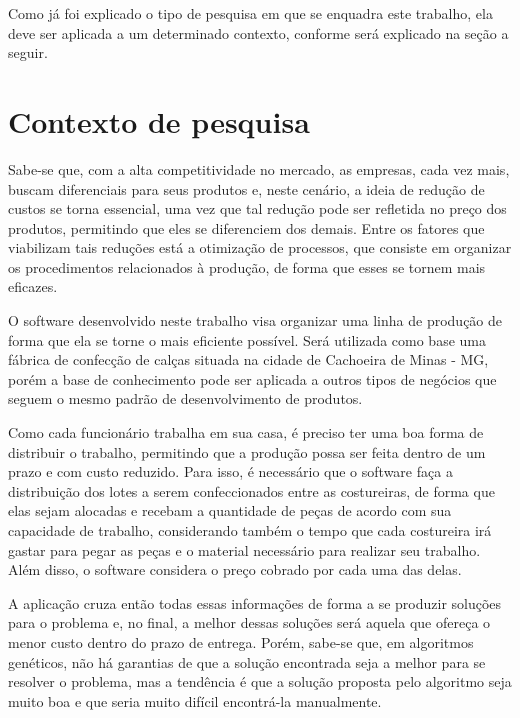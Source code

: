 \par Como já foi explicado o tipo de pesquisa em que se enquadra este trabalho,
ela deve ser aplicada a um determinado contexto, conforme será explicado na
seção a seguir.

\section{Contexto de pesquisa}

\par Sabe-se que, com a alta competitividade no mercado, as empresas, cada vez mais,
buscam diferenciais para seus produtos e, neste cenário, a ideia
de redução de custos se torna essencial, uma vez que tal redução pode ser
refletida no preço dos produtos, permitindo que eles se diferenciem dos demais.
Entre os fatores que viabilizam tais reduções está a otimização de processos, que
consiste em organizar os procedimentos relacionados à produção, de forma que
esses se tornem mais eficazes.

\par O software desenvolvido neste trabalho visa organizar uma linha de produção
de forma que ela se torne o mais eficiente possível. Será utilizada como
base uma fábrica de confecção de calças situada na cidade de
Cachoeira de Minas - MG, porém a base de conhecimento pode ser aplicada a outros
tipos de negócios que seguem o mesmo padrão de desenvolvimento de produtos.

\par Como cada funcionário trabalha em sua casa, é preciso ter uma boa
forma de distribuir o trabalho, permitindo que a produção possa ser feita
dentro de um prazo e com custo reduzido.
Para isso, é necessário que o software faça a distribuição dos lotes a
serem confeccionados entre as costureiras, de forma que elas sejam
alocadas e recebam a quantidade de peças de acordo com sua
capacidade de trabalho, considerando também o tempo que cada costureira
irá gastar para pegar as peças e o material necessário para realizar seu
trabalho. Além disso, o software considera o preço cobrado por cada uma das
delas.

\par A aplicação cruza então todas essas informações de forma a se produzir soluções para
o problema e, no final, a melhor dessas soluções será aquela que ofereça o menor
custo dentro do prazo de entrega. 
Porém, sabe-se que, em algoritmos genéticos, não há garantias de que a solução encontrada 
seja a melhor para se resolver o problema, mas a tendência é que a solução proposta pelo
algoritmo seja muito boa e que seria muito difícil encontrá-la manualmente. 

